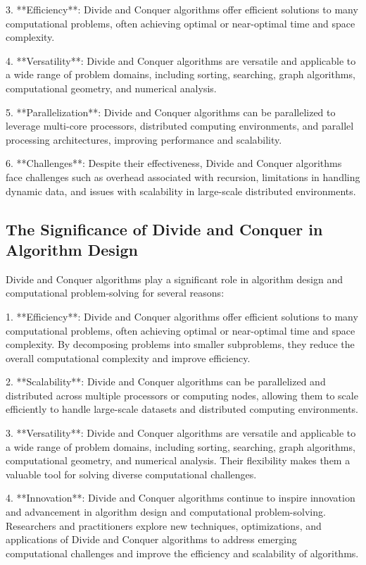 \documentclass[12pt]{book} %
\begin{document}
3. **Efficiency**: Divide and Conquer algorithms offer efficient solutions to many computational problems, often achieving optimal or near-optimal time and space complexity.

4. **Versatility**: Divide and Conquer algorithms are versatile and applicable to a wide range of problem domains, including sorting, searching, graph algorithms, computational geometry, and numerical analysis.

5. **Parallelization**: Divide and Conquer algorithms can be parallelized to leverage multi-core processors, distributed computing environments, and parallel processing architectures, improving performance and scalability.

6. **Challenges**: Despite their effectiveness, Divide and Conquer algorithms face challenges such as overhead associated with recursion, limitations in handling dynamic data, and issues with scalability in large-scale distributed environments.

\subsection{The Significance of Divide and Conquer in Algorithm Design}

Divide and Conquer algorithms play a significant role in algorithm design and computational problem-solving for several reasons:

1. **Efficiency**: Divide and Conquer algorithms offer efficient solutions to many computational problems, often achieving optimal or near-optimal time and space complexity. By decomposing problems into smaller subproblems, they reduce the overall computational complexity and improve efficiency.

2. **Scalability**: Divide and Conquer algorithms can be parallelized and distributed across multiple processors or computing nodes, allowing them to scale efficiently to handle large-scale datasets and distributed computing environments.

3. **Versatility**: Divide and Conquer algorithms are versatile and applicable to a wide range of problem domains, including sorting, searching, graph algorithms, computational geometry, and numerical analysis. Their flexibility makes them a valuable tool for solving diverse computational challenges.

4. **Innovation**: Divide and Conquer algorithms continue to inspire innovation and advancement in algorithm design and computational problem-solving. Researchers and practitioners explore new techniques, optimizations, and applications of Divide and Conquer algorithms to address emerging computational challenges and improve the efficiency and scalability of algorithms.
\end{document}
